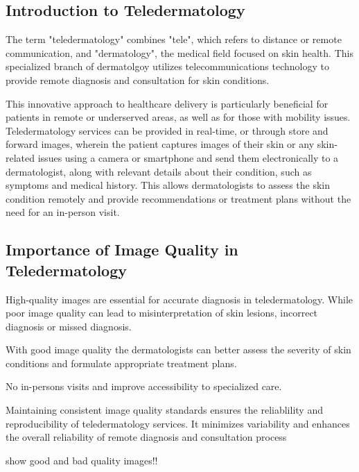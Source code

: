 \subsection{Introduction to Teledermatology}
\label{sub:IntroductionTeledermatology}
The term "teledermatology" combines "tele", which refers to distance or remote communication, and "dermatology", the medical field focused on skin health. This specialized branch of dermatolgoy utilizes telecommunications technology to provide remote diagnosis and consultation for skin conditions.\par
\vspace{\baselineskip}
\noindent
This innovative approach to healthcare delivery is particularly beneficial for patients in remote or underserved areas, as well as for those with mobility issues. Teledermatology services can be provided in real-time, or through store and forward images, wherein the patient captures images of their skin or any skin-related issues using a camera or smartphone and send them electronically to a dermatologist, along with relevant details about their condition, such as symptoms and medical history. This allows dermatologists to assess the skin condition remotely and provide recommendations or treatment plans without the need for an in-person visit.\par

\subsection{Importance of Image Quality in Teledermatology}
\label{sub:ImportanceIQA_Teledermatology}
High-quality images are essential for accurate diagnosis in teledermatology. While poor image quality can lead to misinterpretation of skin lesions, incorrect diagnosis or missed diagnosis. \par
\vspace{\baselineskip}
\noindent
With good image quality the dermatologists can better assess the severity of skin conditions and formulate appropriate treatment plans.\par
\vspace{\baselineskip}
\noindent
No in-persons visits and improve accessibility to specialized care.\par
\vspace{\baselineskip}
\noindent
Maintaining consistent image quality standards ensures the reliablility and reproducibility of teledermatology services. It minimizes variability and enhances the overall reliability of remote diagnosis and consultation process\par
\vspace{\baselineskip}
\noindent
show good and bad quality images!!\par

